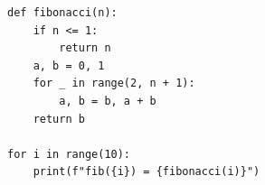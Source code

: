 
\begin{singlespace}
\begin{lstlisting}[caption={Ukázka zdrojového kódu v jazyce Python}, label={code:example}]
def fibonacci(n):
    if n <= 1:
        return n
    a, b = 0, 1
    for _ in range(2, n + 1):
        a, b = b, a + b
    return b

for i in range(10):
    print(f"fib({i}) = {fibonacci(i)}")
\end{lstlisting}
\end{singlespace}
